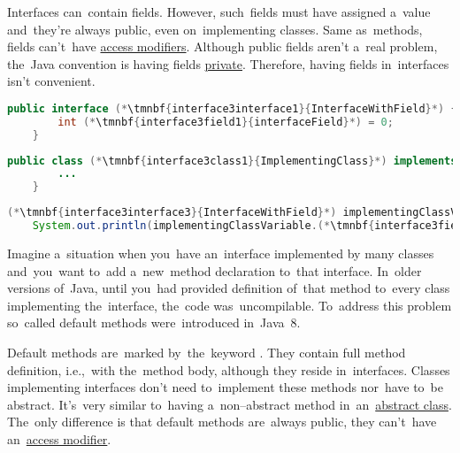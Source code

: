 \noindent Interfaces can~contain fields.
However, such~fields must have assigned a~value and~they're always public, even on~implementing classes.
Same as~methods, fields can't~have \hyperref[javaaccessmodofiers]{access modifiers}.
Although public fields aren't a~real problem, the~Java convention is having fields \hyperref[javaprivate]{private}.
Therefore, having fields in~interfaces isn't convenient.

\enlargethispage{20mm}
\thispagestyle{empty}
\begin{lstlisting}[language=Java, title={Interface with field}]
    public interface (*\tmnbf{interface3interface1}{InterfaceWithField}*) {
        int (*\tmnbf{interface3field1}{interfaceField}*) = 0;
    }
\end{lstlisting}
\begin{lstlisting}[language=Java, title={Implementing class}]
    public class (*\tmnbf{interface3class1}{ImplementingClass}*) implements (*\tmnbf{interface3interface2}{InterfaceWithField}*) {
        ...
    }
\end{lstlisting}
\begin{lstlisting}[language=Java, title={Usage}]
    (*\tmnbf{interface3interface3}{InterfaceWithField}*) implementingClassVariable = new (*\tmnbf{interface3class2}{ImplementingClass}*)();
    System.out.println(implementingClassVariable.(*\tmnbf{interface3field2}{interfaceField}*));
\end{lstlisting}
\newpage

Imagine a~situation when you~have an~interface implemented by many classes and~you~want to~add a~new~method declaration to~that interface.
In~older versions of~Java, until you~had provided definition of~that method to~every class implementing the~interface, the~code was~uncompilable.
To~address this problem so~called default methods were~introduced in~Java~8.

Default methods are~marked by~the~keyword .
They contain full method definition, i.e.,~with the~method body, although they reside in~interfaces.
Classes implementing interfaces don't need to~implement these methods nor~have to~be abstract.
It's~very similar to~having a~non--abstract method in~an~\hyperref[javaabstractclasses]{abstract class}.
The~only difference is that default methods are~always public, they can't~have an~\hyperref[javaaccessmodifiers]{access modifier}.

